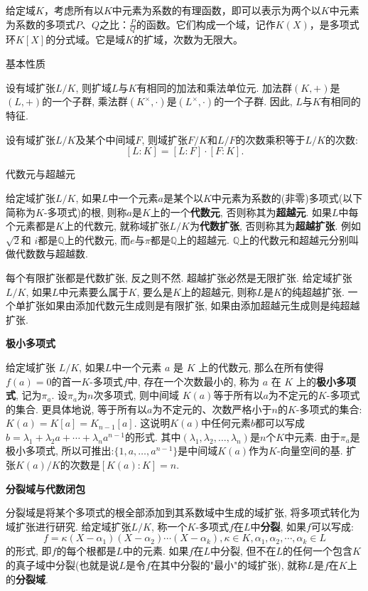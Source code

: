 \documentclass[UTF8]{ctexart}
\begin{document}
\begin{enumerate}
给定域$K$，考虑所有以$K$中元素为系数的有理函数，即可以表示为两个以$K$中元素为系数的多项式$P$、$Q$之比：$\frac{P}{Q}$的函数。它们构成一个域，记作$K(X)$，是多项式环$K[X]$的分式域。它是域$K$的扩域，次数为无限大。

基本性质

设有域扩张$L/K$, 则扩域$L$与$K$有相同的加法和乘法单位元. 加法群$(K,+)$是$(L,+)$的一个子群, 乘法群$(K^{×},\cdot)$是$(L^{\times},\cdot)$的一个子群. 因此, $L$与$K$有相同的特征.

设有域扩张$L/K$及某个中间域$F$, 则域扩张$F/K$和$L/F$的次数乘积等于$L/K$的次数:
\[
[L:K] = [L:F]\cdot[F:K].
\]

代数元与超越元

给定域扩张$L/K$, 如果$L$中一个元素$a$是某个以$K$中元素为系数的(非零)多项式(以下简称为$K$-多项式)的根, 则称$a$是$K$上的一个\textbf{代数元}, 否则称其为\textbf{超越元}. 如果$L$中每个元素都是$K$上的代数元, 就称域扩张$L/K$为\textbf{代数扩张}, 否则称其为\textbf{超越扩张}. 例如 $\sqrt{2}$和 $i$都是$\mathbb{Q}$上的代数元, 而$e$与$\pi$都是$\mathbb{Q}$上的超越元. $\mathbb{Q}$上的代数元和超越元分别叫做代数数与超越数.

每个有限扩张都是代数扩张, 反之则不然. 超越扩张必然是无限扩张. 给定域扩张 $L/K$, 如果$L$中元素要么属于$K$, 要么是$K$上的超越元, 则称$L$是$K$的纯超越扩张. 一个单扩张如果由添加代数元生成则是有限扩张, 如果由添加超越元生成则是纯超越扩张.

\textbf{极小多项式}

给定域扩张 $L/K$, 如果$L$中一个元素 $a$ 是 $K$ 上的代数元, 那么在所有使得$f(a)=0$的首一$K$-多项式$f$中, 存在一个次数最小的, 称为 $a$ 在 $K$ 上的\textbf{极小多项式}, 记为$\pi_{a}$. 设$\pi_a$为$n$次多项式, 则中间域 $K(a)$等于所有以$a$为不定元的$K$-多项式的集合. 更具体地说, 等于所有以$a$为不定元的、次数严格小于$n$的$K$-多项式的集合: $K(a) = K[a] = K_{n-1}[a]$. 这说明$K(a)$中任何元素$b$都可以写成$b = \lambda_1 + \lambda_2a +\cdots+ \lambda_na^{n-1}$的形式. 其中$(\lambda_1,\lambda_2,\ldots,\lambda_n)$是$n$个$K$中元素. 由于$\pi_a$是极小多项式, 所以可推出:$\{1,a,\ldots,a^{n-1}\}$是中间域$K(a)$作为$K$-向量空间的基. 扩张$K(a)/K$的次数是$[K(a):K] = n$.

\textbf{分裂域与代数闭包}

分裂域是将某个多项式的根全部添加到其系数域中生成的域扩张, 将多项式转化为域扩张进行研究. 给定域扩张$L/K$, 称一个$K$-多项式$f$在$L$中\textbf{分裂}, 如果$f$可以写成:
\[
f = \kappa(X-\alpha_1)(X-\alpha_2)\cdots(X-\alpha_k),\kappa\in K,\alpha_1,\alpha_2,\cdots,\alpha_k \in L
\]
的形式, 即$f$的每个根都是$L$中的元素. 如果$f$在$L$中分裂, 但不在$L$的任何一个包含$K$的真子域中分裂(也就是说$L$是令$f$在其中分裂的"最小"的域扩张), 就称$L$是$f$在$K$上的\textbf{分裂域}.


\end{enumerate}
\end{document}
